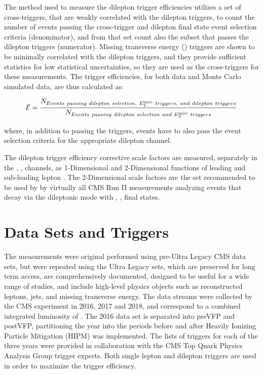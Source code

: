 The method used to measure the dilepton trigger efficiencies utilizes a set of cross-triggers, that are weakly correlated with the dilepton triggers, to count the number of events passing the cross-trigger and \ttbar dilepton final state event selection criteria (denominator), and from that set count also the subset that passes the dilepton triggers (numerator).
Missing transverse energy (\MET) triggers are shown to be minimally correlated with the dilepton triggers, and they provide sufficient statistics for low statistical uncertainties, so they are used as the cross-triggers for these measurements. 
The trigger efficiencies, for both data and Monte Carlo simulated data, are thus calculated as: 
\begin{linenomath*}
\begin{align}
\mathcal{E} = \frac{N_{Events ~passing ~dilepton ~selection, ~E_{\mathrm{T}}^{\text{miss}} ~triggers, ~and ~dilepton ~triggers}}{N_{Events ~passing ~dilepton ~selection ~and ~E_{\mathrm{T}}^{\text{miss}} ~triggers}}
\label{efficiency}
\end{align}
\end{linenomath*}
where, in addition to passing the triggers, events have to also pass the event selection criteria for the appropriate dilepton channel. 

The dilepton trigger efficiency corrective scale factors are measured, separately in the \ee, \emu, \mumu channels, as 1-Dimensional and 2-Dimensional functions of leading and sub-leading lepton \pT.
The 2-Dimensional scale factors are the set recommended to be used by by virtually all CMS Run II measurements analyzing \ttbar events that decay via the dileptonic mode with \ee, \emu, \mumu final states.

\section{Data Sets and Triggers}
The measurements were original performed using pre-Ultra Legacy CMS data sets, but were repeated using the Ultra Legacy sets, which are preserved for long term access, are comprehensively documented, designed to be useful for a wide range of studies, and include high-level physics objects such as reconstructed leptons, jets, and missing transverse energy.
The data streams were collected by the CMS experiment in 2016, 2017 and 2018, and correspond to a combined integrated luminosity of \lumivalueRuniiUL.
The 2016 data set is separated into preVFP and postVFP, partitioning the year into the periods before and after Heavily Ionizing Particle Mitigation (HIPM) was implemented.
The lists of triggers for each of the three years were provided in collaboration with the CMS Top Quark Physics Analysis Group trigger experts. 
Both single lepton and dilepton triggers are used in order to maximize the trigger efficiency. 

